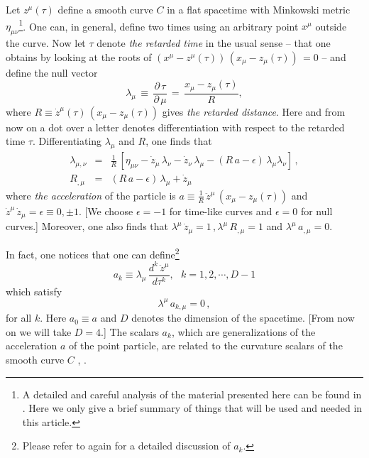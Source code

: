 \documentclass[a4paper,twocolumn,prd,showpacs,amsmath,amssymb]{revtex4}
\begin{document}
Let $z^{\mu} (\tau)$ define a smooth curve $C$ in a flat spacetime with Minkowski
metric $\eta_{\mu\nu}$\footnote{A detailed and careful analysis of the material
presented here can be found in \cite{gs1}. Here we only give a brief summary of
things that will be used and needed in this article.}. One can, in general,
define two times using an arbitrary point $x^{\mu}$ outside the curve.
Now let $\tau$ denote {\it the retarded time}
in the usual sense -- that one obtains by looking at the roots of
\( (x^{\mu} - z^{\mu} (\tau)) \, (x_{\mu} - z_{\mu} (\tau)) \, = 0\) -- and
define the null vector
\begin{equation}
\lambda_{\mu} \, \equiv \, \frac{\partial \, \tau}{\partial \, \mu} \,
= \, \frac{x_{\mu}-z_{\mu}(\tau)}{R},
\label{lam}
\end{equation}
where \( R \equiv \dot{z}^{\mu}(\tau) \, (x_{\mu}-z_{\mu}(\tau)) \) gives
{\it the retarded distance}. Here and from now on a dot over a letter denotes
differentiation with respect to the retarded time $\tau$. Differentiating
$\lambda_{\mu}$ and $R$, one finds that
\begin{eqnarray}
\lambda_{\mu, \nu} & = & \frac{1}{R} \, [\eta_{\mu \nu} - \dot{z}_{\mu} \,
\lambda_{\nu} - \dot{z}_{\nu} \, \lambda_{\mu} - (R \, a - \epsilon) \,
\lambda_{\mu} \lambda_{\nu}] \, , \\
R_{,\mu} & = & (R \, a - \epsilon) \, \lambda_{\mu} + \dot{z}_{\mu} \label{rder}
\end{eqnarray}
where {\it the acceleration} of the particle is \( a \equiv \frac{1}{R} \,
\ddot{z}^{\mu} \, (x_{\mu}-z_{\mu}(\tau)) \) and
\( \dot{z}^{\mu} \, \dot{z}_{\mu} = \epsilon \equiv 0, \pm 1 .\) [We choose
$\epsilon =-1$ for time-like curves and $\epsilon =0$ for null curves.] Moreover,
one also finds that \( \lambda^{\mu} \, \dot{z}_{\mu} = 1 \,,
\lambda^{\mu} \, R_{,\mu} = 1 \) and \(\lambda^{\mu} \, a_{,\mu} = 0 .\)

In fact, one notices that one can define\footnote{Please refer to \cite{gs1}
again for a detailed discussion of $a_{k}$.}
\[ a_{k} \equiv \lambda_{\mu} \, \frac{d^k \, \ddot{z}^{\mu}}{d \tau^k},
~~~k=1,2,\cdots ,D-1 \] which satisfy
\begin{equation}
\lambda^{\mu} \, a_{k,\mu} = 0 \, , \label{akmlam}
\end{equation}
for all $k$. Here $a_0 \equiv a$ and $D$ denotes the dimension of the spacetime.
[From now on we will take $D=4$.] The scalars $a_{k}$, which are
generalizations of the acceleration $a$ of the point particle, are related
to the curvature scalars of the smooth curve $C$ \cite{spi}, \cite{gs1}.
\end{document}
